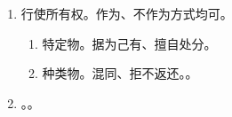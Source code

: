 \begin{enumerate}
\begin{enumerate}
\begin{enumerate}
\begin{enumerate}
                          \item {}。
                        \end{enumerate}
                  \item 埋藏物、遗失物。\yi 遗忘（临时/永久）。\er 场所如公园、公交车。
                  \item 列举不完，记行为公式而不是常见情形。
                \end{enumerate}
          \item 行使所有权。作为、不作为方式均可。
                \begin{enumerate}
                  \item 特定物。据为己有、擅自处分。
                  \item 种类物。混同、拒不返还。。
                \end{enumerate}
          \item {}。。
        \end{enumerate}
\end{enumerate}
